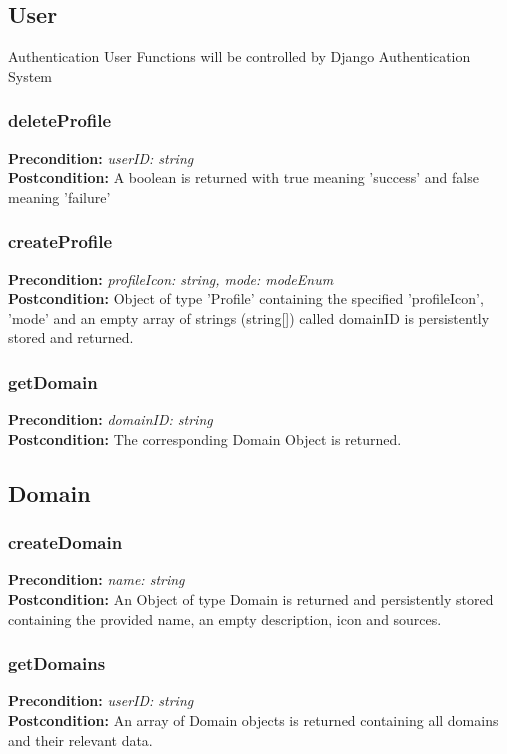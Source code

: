 \documentclass[12pt]{article}
\begin{document}
\subsection{User}
Authentication User Functions will be controlled by Django Authentication System

\subsubsection*{deleteProfile}
\textbf{Precondition:} \textit{userID: string} \\
\textbf{Postcondition:} A boolean is returned with true meaning 'success' and false meaning 'failure'

\subsubsection*{createProfile}
\textbf{Precondition:} \textit{profileIcon: string, mode: modeEnum} \\
\textbf{Postcondition:} Object of type 'Profile' containing the specified 'profileIcon', 'mode' and an empty array of strings (string[]) called domainID is persistently stored and returned.

\subsubsection*{getDomain}
\textbf{Precondition:} \textit{domainID: string} \\
\textbf{Postcondition:} The corresponding Domain Object is returned.

\subsection{Domain}

\subsubsection*{createDomain}
\textbf{Precondition:} \textit{name: string} \\
\textbf{Postcondition:} An Object of type Domain is returned and persistently stored containing the provided name, an empty description, icon and sources.

\subsubsection*{getDomains}
\textbf{Precondition:} \textit{userID: string} \\
\textbf{Postcondition:} An array of Domain objects is returned containing all domains and their relevant data.
\end{document}
